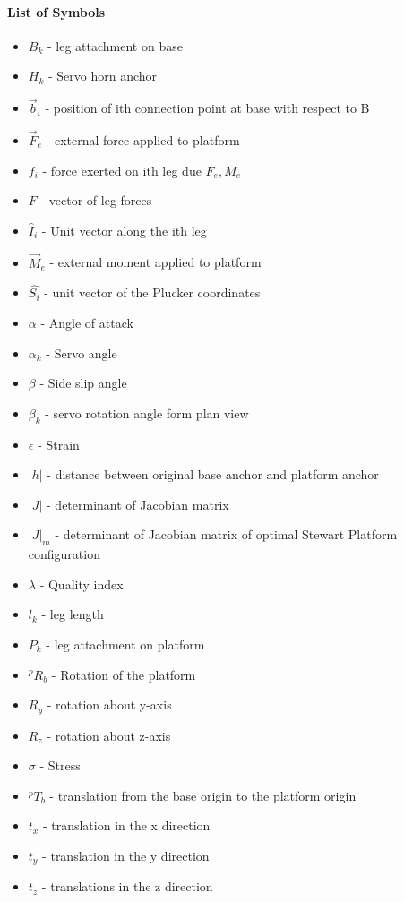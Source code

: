 \paragraph{List of Symbols}
\begin{itemize}
    \item $B_{k}$ - leg attachment on base
    \item $H_{k}$ - Servo horn anchor
    \item $\vec{b}_i$ - position of ith connection point at base with respect to B
    \item $\vec{F}_e$ - external force applied to platform
    \item $f_i$ - force exerted on ith leg due $F_e, M_e$
    \item $F$ - vector of leg forces
    \item $\hat{I}_i$ - Unit vector along the ith leg
    \item $\vec{M}_e$ - external moment applied to platform
    \item $\hat{{S_{i}}}$ - unit vector of the Plucker coordinates
    \item $\alpha$ - Angle of attack
    \item $\alpha_{k}$ - Servo angle
    \item $\beta$ - Side slip angle
    \item $\beta_{k}$ - servo rotation angle form plan view
    \item $\epsilon$ - Strain
    \item $|h|$ - distance between original base anchor and platform anchor
    \item $|J|$ - determinant of Jacobian matrix
    \item $|J|_{m}$ - determinant of Jacobian matrix of optimal Stewart Platform configuration
    \item $\lambda$ - Quality index
    \item $l_{k}$ - leg length
    \item $P_{k}$ - leg attachment on platform
    \item $^{p}R_{b}$ - Rotation of the platform
    \item $R_{y}$ - rotation about y-axis
    \item $R_{z}$ - rotation about z-axis
    \item $\sigma$ - Stress
    \item $^{p}T_{b}$ - translation from the base origin to the platform origin
    \item $t_{x}$ -  translation in the x direction
    \item $t_{y}$ -  translation in the y direction
    \item $t_{z} $ -  translations in the z direction
\end{itemize}
\pagebreak